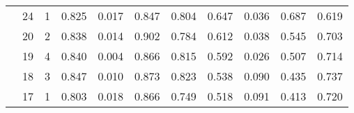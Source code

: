 \begin{tabular}{c|rr|cccc|cccc}
 &24 &      1 &   0.825 &          0.017 &    0.847 &     0.804 &    0.647 &           0.036 &     0.687 &      0.619 \\
 &20 &      2 &   0.838 &          0.014 &    0.902 &     0.784 &    0.612 &           0.038 &     0.545 &      0.703 \\
 &19 &      4 &   0.840 &          0.004 &    0.866 &     0.815 &    0.592 &           0.026 &     0.507 &      0.714 \\
 &18 &      3 &   0.847 &          0.010 &    0.873 &     0.823 &    0.538 &           0.090 &     0.435 &      0.737 \\
 &17 &      1 &   0.803 &          0.018 &    0.866 &     0.749 &    0.518 &           0.091 &     0.413 &      0.720 \\
\hline
\end{tabular}
